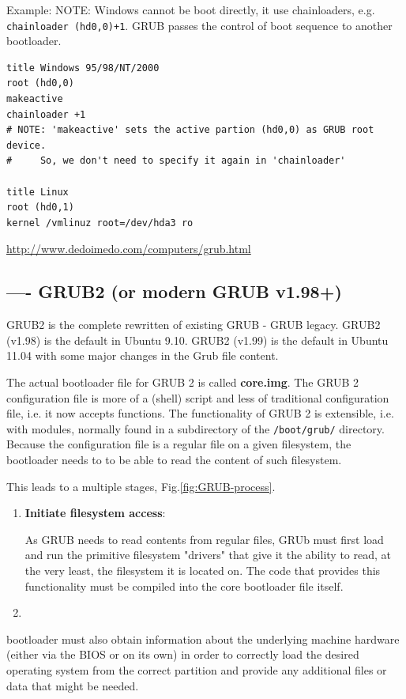 Example: NOTE: Windows cannot be boot directly, it use chainloaders, e.g.
\verb!chainloader (hd0,0)+1!. GRUB passes the control of boot sequence to
another bootloader.

\begin{verbatim}
title Windows 95/98/NT/2000
root (hd0,0)
makeactive
chainloader +1
# NOTE: 'makeactive' sets the active partion (hd0,0) as GRUB root device.
#     So, we don't need to specify it again in 'chainloader'

title Linux
root (hd0,1)
kernel /vmlinuz root=/dev/hda3 ro
\end{verbatim}

\url{http://www.dedoimedo.com/computers/grub.html}

\subsection{---- GRUB2 (or modern GRUB v1.98+)}
\label{sec:GRUB2}

GRUB2 is the complete rewritten of existing GRUB - GRUB legacy. GRUB2 (v1.98) is
the default in Ubuntu 9.10. GRUB2 (v1.99) is the default in Ubuntu 11.04 with
some major changes in the Grub file content.

The actual bootloader file for GRUB 2 is called {\bf core.img}.
The GRUB 2 configuration file is more of a (shell) script and less of
traditional configuration file, i.e. it now accepts functions.
The functionality of GRUB 2 is extensible, i.e. with modules,
normally found in a subdirectory of the \verb!/boot/grub/! directory.
Because the configuration file is a regular file on a given filesystem, the
bootloader needs to to be able to read the content of such filesystem.

This leads to a multiple stages, Fig.\ref{fig:GRUB-process}.
\begin{enumerate}
  \item {\bf Initiate filesystem access}: 
  
As GRUB needs to read contents from regular files, GRUb must first load and run
the primitive filesystem "drivers" that give it the ability to read, at the very
least, the filesystem it is located on.
The code that provides this functionality must be compiled into the core
bootloader file itself.

  \item 
\end{enumerate}

 bootloader must also obtain information about the underlying machine hardware
(either via the BIOS or on its own) in order to correctly load the desired
operating system from the correct partition and provide any additional files or
data that might be needed.  


